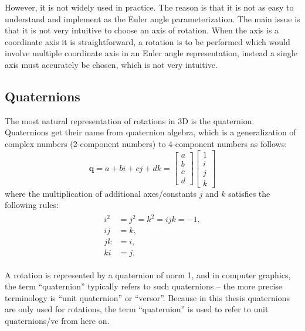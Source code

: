However, it is not widely used in practice. The reason is that it is not as easy to understand and implement as the Euler angle parameterization. The main issue is that it is not very intuitive to choose an axis of rotation. When the axis is a coordinate axis it is straightforward, a rotation is to be performed which would involve multiple coordinate axis in an Euler angle representation, instead a single axis must accurately be chosen, which is not very intuitive.

\subsection{Quaternions}

The most natural representation of rotations in 3D is the quaternion. Quaternions get their name from quaternion algebra, which is a generalization of complex numbers (2-component numbers) to 4-component numbers as follows:
\begin{equation}
    \mathbf{q} = a + bi + cj + dk =
    \begin{bmatrix}
        a \\
        b \\
        c \\
        d
    \end{bmatrix}
    \begin{bmatrix}
        1 \\
        i \\
        j \\
        k
    \end{bmatrix}
\end{equation}
where the multiplication of additional axes/constants $j$ and $k$ satisfies the following rules:
\begin{align}
\label{eqn:quat-def}
\begin{aligned}
    i^2 &= j^2 = k^2 = ijk = -1, \\
    ij &= k, \\
    jk &= i, \\
    ki &= j.
\end{aligned}
\end{align}

A rotation is represented by a quaternion of norm 1, and in computer graphics, the term ``quaternion'' typically refers to such quaternions -- the more precise terminology is ``unit quaternion'' or ``versor''. Because in this thesis quaternions are only used for rotations, the term ``quaternion'' is used to refer to unit quaternions/ve from here on.

